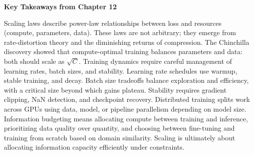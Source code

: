 \begin{pausebox}
\textbf{Key Takeaways from Chapter 12}

Scaling laws describe power-law relationships between loss and resources (compute, parameters, data). These laws are not arbitrary; they emerge from rate-distortion theory and the diminishing returns of compression. The Chinchilla discovery showed that compute-optimal training balances parameters and data: both should scale as $\sqrt{C}$. Training dynamics require careful management of learning rates, batch sizes, and stability. Learning rate schedules use warmup, stable training, and decay. Batch size tradeoffs balance exploration and efficiency, with a critical size beyond which gains plateau. Stability requires gradient clipping, NaN detection, and checkpoint recovery. Distributed training splits work across GPUs using data, model, or pipeline parallelism depending on model size. Information budgeting means allocating compute between training and inference, prioritizing data quality over quantity, and choosing between fine-tuning and training from scratch based on domain similarity. Scaling is ultimately about allocating information capacity efficiently under constraints.
\end{pausebox}
